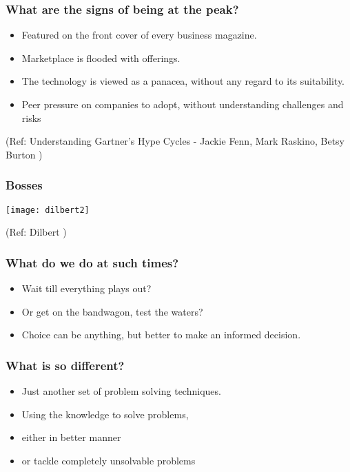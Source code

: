 \begin{frame}[fragile]\frametitle{What are the signs of being at the peak?}
\begin{itemize}
\item Featured on the front cover of every business magazine.
\item Marketplace is flooded with offerings.
\item  The technology is viewed as a panacea, without any regard to its
suitability.
\item Peer pressure on companies to adopt, without understanding challenges and risks
\end{itemize}
{\tiny (Ref: Understanding Gartner's Hype Cycles - Jackie Fenn, Mark Raskino, Betsy Burton )}
\end{frame}

\begin{frame}[fragile]\frametitle{Bosses}
\begin{center}
\texttt{[image: dilbert2]}
\end{center}
{\tiny (Ref: Dilbert )}
\end{frame}

\begin{frame}[fragile]\frametitle{What do we do at such times?}
\begin{itemize}
\item Wait till everything plays out?
\item Or get on the bandwagon, test the waters?
\item Choice can be anything, but better to make an informed decision.
\end{itemize}
\end{frame}

\begin{frame}[fragile]\frametitle{What is so different?}
\begin{itemize}
\item Just another set of problem solving techniques.
\item Using the knowledge to solve problems, 
\item either in better manner
\item or tackle completely unsolvable problems 
\end{itemize}
\end{frame}

